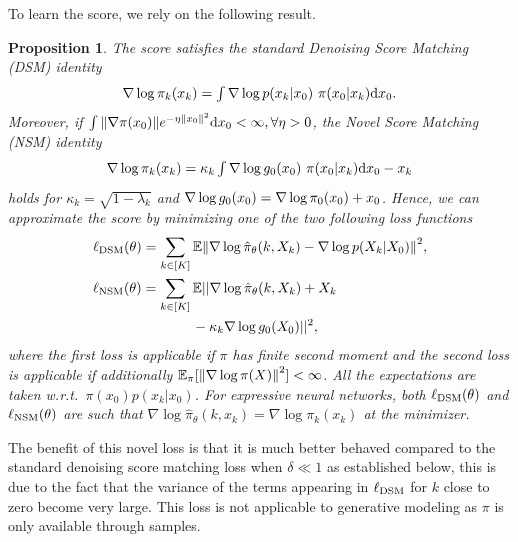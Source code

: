 \documentclass{article}
\theoremstyle{plain}
\newtheorem{proposition}[theorem]{Proposition}
\theoremstyle{definition}
\theoremstyle{remark}
\begin{document}
To learn the score, we rely on the following result.
\begin{proposition}\label{prop:scorematching}
	The score satisfies the standard Denoising Score Matching (DSM) identity
	\begin{equation}\label{eq:DSM}
		\textstyle  \nabla\log \pi_k(x_k) = \int \nabla \log p(x_k|x_0)~ \pi(x_0|x_k) \dd x_0.
	\end{equation}
	Moreover, if $\int\norm{\nabla \pi(x_0)} e^{-\eta\norm{x_0}^2} \dd x_0 < \infty, \forall \eta>0$, the Novel Score Matching (NSM) identity
	\begin{equation}\label{eq:VDB}
		\textstyle  \nabla\log \pi_k(x_k) =\kappa_k \int \nabla\log  g_0(x_0)~ \pi(x_0|x_k) \dd x_0 -x_k
	\end{equation}
	holds for $\kappa_k=\sqrt{1-\lambda_k}$ and $\nabla\log  g_0(x_0)=\nabla \log \pi_0(x_0)+x_0$.
	Hence, we can approximate the score by minimizing one of the two following loss functions
	\begin{align*}
		\textstyle & \ell_{\textup{DSM}}(\theta)=\sum_{k\in[K]} \mathbb{E}\norm{\nabla \log \hat \pi_{\theta}(k, X_k) - \nabla \log p(X_k|X_0)}^2, \\
		\textstyle & \ell_{\textup{NSM}}(\theta)=\sum_{k\in[K]} \mathbb{E}||\nabla \log \hat \pi_{\theta}(k, X_k) + X_k                            \\
		           & \hspace{2.5cm} -\kappa_k \nabla\log g_0(X_0)||^2,
	\end{align*}
	where the first loss is applicable if $\pi$ has finite second moment and the second loss is applicable if additionally $\mathbb{E}_{\pi}[\norm{\nabla\log \pi(X)}^2] < \infty$.
	All the expectations are taken w.r.t.\ $\pi(x_0)p(x_k|x_0)$. For expressive neural networks, both $\ell_{\textup{DSM}}(\theta)$ and $\ell_{\textup{NSM}}(\theta)$ are such that $\nabla \log \hat \pi_{\theta}(k, x_k)=\nabla \log \pi_k(x_k)$ at the minimizer.
\end{proposition}

The benefit of this novel loss is that it is much better behaved compared to the standard denoising score matching loss when $\delta \ll 1$ as established below, this is due to the fact that the variance of the terms appearing in $\ell_{\textup{DSM}}$ for $k$ close to zero become very large. This loss is not applicable to generative modeling as $\pi$ is only available through samples.

\newcommand{\ggrad}{\mathfrak g}
\newcommand{\IA}{I_{\mathrm{A}}}
\newcommand{\IB}{I_{\mathrm{B}}}
\newcommand{\gga}{\ggrad^{\mathrm{A}}}
\newcommand{\ggb}{\ggrad^{\mathrm{B}}}
\end{document}
